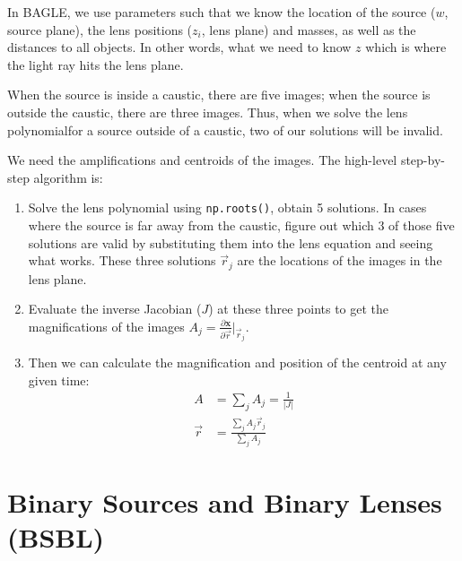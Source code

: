 \documentclass[twocolumn]{aastex701}
\newcommand{\vect}[1]{\boldsymbol{#1}}
\begin{document}
In BAGLE, we use parameters such that we know the location of the source ($w$, source plane), the lens positions ($z_i$, lens plane) and masses, as well as the distances to all objects.
In other words, what we need to know $z$ which is where the light ray hits the lens plane.

When the source is inside a caustic, there are five images; when the source is outside the caustic, there are three images. Thus, when we solve the lens polynomialfor a source outside of a caustic, two of our solutions will be invalid.

We need the amplifications and centroids of the images. The high-level step-by-step algorithm is:

\begin{enumerate}
    \item Solve the lens polynomial using \texttt{np.roots()}, obtain 5 solutions. In cases where the source is far away from the caustic, figure out which 3 of those five solutions are valid by substituting them into the lens equation and seeing what works. These three solutions $\vec{r}_j$ are the locations of the images in the lens plane.
    \item Evaluate the inverse Jacobian ($J$) at these three points to get the magnifications of the images $A_j = \frac{\partial \vect{x}}{ \partial \vec{r}} |_{\vec{r}_j}$. 
    \item Then we can calculate the magnification and position of the centroid at any given time: 
    \begin{align}
        A &= \sum_j A_j  = \frac{1}{|J|}\\
        \vec{r} &= \frac{\sum_j A_j \vec{r}_j}{\sum_j A_j}
    \end{align}
\end{enumerate}


\section{Binary Sources and Binary Lenses (BSBL) \label{sec:bineverything}}
 
\end{document}
